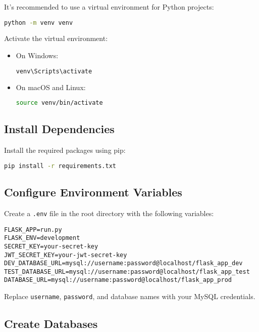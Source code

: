 \documentclass{article}
\begin{document}
It's recommended to use a virtual environment for Python projects:

\begin{lstlisting}[language=bash]
python -m venv venv
\end{lstlisting}

Activate the virtual environment:

\begin{itemize}
    \item On Windows:
    \begin{lstlisting}[language=bash]
venv\Scripts\activate
    \end{lstlisting}
    
    \item On macOS and Linux:
    \begin{lstlisting}[language=bash]
source venv/bin/activate
    \end{lstlisting}
\end{itemize}

\subsection{Install Dependencies}

Install the required packages using pip:

\begin{lstlisting}[language=bash]
pip install -r requirements.txt
\end{lstlisting}

\subsection{Configure Environment Variables}

Create a \texttt{.env} file in the root directory with the following variables:

\begin{lstlisting}
FLASK_APP=run.py
FLASK_ENV=development
SECRET_KEY=your-secret-key
JWT_SECRET_KEY=your-jwt-secret-key
DEV_DATABASE_URL=mysql://username:password@localhost/flask_app_dev
TEST_DATABASE_URL=mysql://username:password@localhost/flask_app_test
DATABASE_URL=mysql://username:password@localhost/flask_app_prod
\end{lstlisting}

Replace \texttt{username}, \texttt{password}, and database names with your MySQL credentials.

\subsection{Create Databases}
\end{document}
